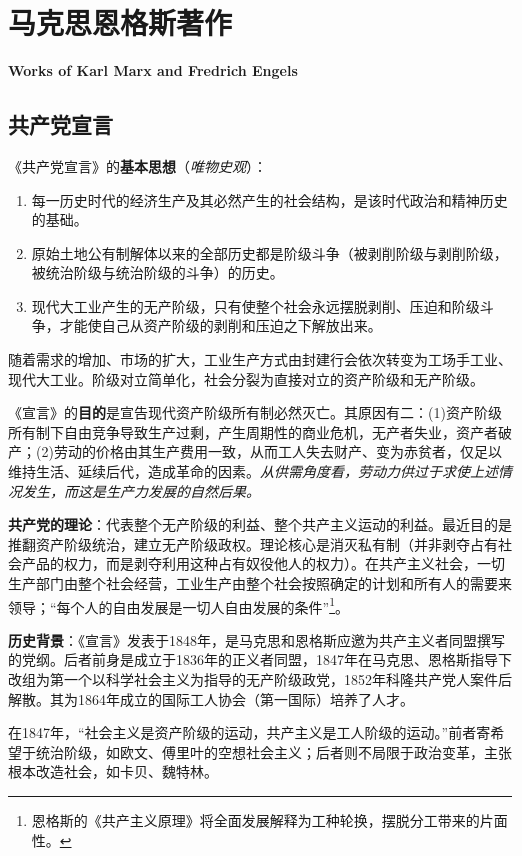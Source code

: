 \chapter{马克思恩格斯著作}
\Large\textbf{Works of Karl Marx and Fredrich Engels}\normalsize

\section{共产党宣言}

\par 《共产党宣言》的\textbf{基本思想}（\emph{唯物史观}）：
\begin{enumerate}
    \item 每一历史时代的经济生产及其必然产生的社会结构，是该时代政治和精神历史的基础。
    \item 原始土地公有制解体以来的全部历史都是阶级斗争（被剥削阶级与剥削阶级，被统治阶级与统治阶级的斗争）的历史。
    \item 现代大工业产生的无产阶级，只有使整个社会永远摆脱剥削、压迫和阶级斗争，才能使自己从资产阶级的剥削和压迫之下解放出来。
\end{enumerate}

\par 随着需求的增加、市场的扩大，工业生产方式由封建行会依次转变为工场手工业、现代大工业。阶级对立简单化，社会分裂为直接对立的资产阶级和无产阶级。

\par 《宣言》的\textbf{目的}是宣告现代资产阶级所有制必然灭亡。其原因有二：(1)资产阶级所有制下自由竞争导致生产过剩，产生周期性的商业危机，无产者失业，资产者破产；(2)劳动的价格由其生产费用一致，从而工人失去财产、变为赤贫者，仅足以维持生活、延续后代，造成革命的因素。\emph{从供需角度看，劳动力供过于求使上述情况发生，而这是生产力发展的自然后果。}

\par \textbf{共产党的理论}：代表整个无产阶级的利益、整个共产主义运动的利益。最近目的是推翻资产阶级统治，建立无产阶级政权。理论核心是消灭私有制（并非剥夺占有社会产品的权力，而是剥夺利用这种占有奴役他人的权力）。在共产主义社会，一切生产部门由整个社会经营，工业生产由整个社会按照确定的计划和所有人的需要来领导；“每个人的自由发展是一切人自由发展的条件”\footnote{恩格斯的《共产主义原理》将全面发展解释为工种轮换，摆脱分工带来的片面性。}。

\par \textbf{历史背景}：《宣言》发表于1848年，是马克思和恩格斯应邀为共产主义者同盟撰写的党纲。后者前身是成立于1836年的正义者同盟，1847年在马克思、恩格斯指导下改组为第一个以科学社会主义为指导的无产阶级政党，1852年科隆共产党人案件后解散。其为1864年成立的国际工人协会（第一国际）培养了人才。

\par 在1847年，“社会主义是资产阶级的运动，共产主义是工人阶级的运动。”前者寄希望于统治阶级，如欧文、傅里叶的空想社会主义；后者则不局限于政治变革，主张根本改造社会，如卡贝、魏特林。